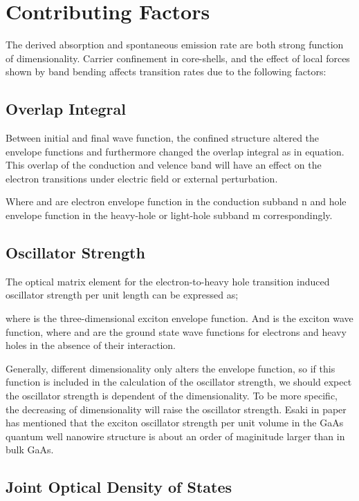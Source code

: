 \section{Contributing Factors} \label{factor}

The derived absorption and spontaneous emission rate are both strong function
of dimensionality. Carrier confinement in core-shells, and the effect of local
forces shown by band bending affects transition rates due to the following
factors:

\subsection{Overlap Integral}

Between initial and final wave function, the confined structure altered the
envelope functions and furthermore changed the overlap integral as in equation.
This overlap of the conduction and velence band will have an effect on the
electron transitions under electric field or external perturbation.

Where and are electron envelope function in the conduction subband n and hole
envelope function in the heavy-hole or light-hole subband m correspondingly.

\subsection{Oscillator Strength}

The optical matrix element for the electron-to-heavy hole transition induced oscillator strength per unit length can be expressed as;

where is the three-dimensional exciton envelope function. And is the exciton
wave function, where and are the ground state wave functions for electrons and
heavy holes in the absence of their interaction.

Generally, different dimensionality only alters the envelope function, so if
this function is included in the calculation of the oscillator strength, we
should expect the oscillator strength is dependent of the dimensionality. To be
more specific, the decreasing of dimensionality will raise the oscillator
strength. Esaki in paper has mentioned that the exciton oscillator strength per
unit volume in the GaAs quantum well nanowire structure is about an order of
maginitude larger than in bulk GaAs.

\subsection{Joint Optical Density of States}

